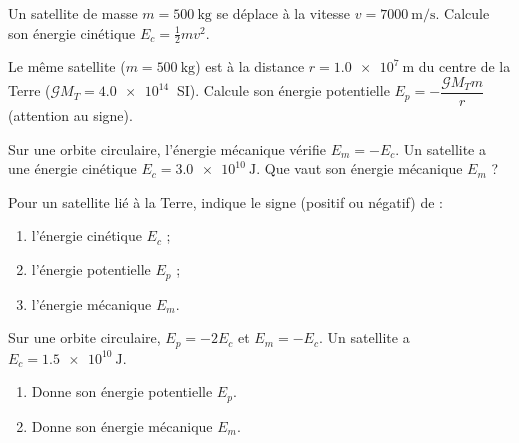 \documentclass[11pt,a4paper]{article}
\begin{document}

\begin{exo}
Un satellite de masse $m=\qty{500}{\kilogram}$ se déplace à la vitesse
$v=\qty{7000}{\metre\per\second}$. Calcule son énergie cinétique $E_c=\tfrac12 m v^2$.
\end{exo}

\begin{exo}
Le même satellite ($m=\qty{500}{\kilogram}$) est à la distance $r=\qty{1.0e7}{\metre}$
du centre de la Terre ($\mathcal{G}M_T=\qty{4.0e14}{}$ SI). Calcule son énergie
potentielle $E_p=-\dfrac{\mathcal{G}M_T m}{r}$ (attention au signe).
\end{exo}

\begin{exo}
Sur une orbite circulaire, l'énergie mécanique vérifie $E_m=-E_c$. Un satellite a une
énergie cinétique $E_c=\qty{3.0e10}{\joule}$. Que vaut son énergie mécanique $E_m$ ?
\end{exo}

\begin{exo}
Pour un satellite lié à la Terre, indique le signe (positif ou négatif) de :
\begin{enumerate}[label=\alph*)]
  \item l'énergie cinétique $E_c$ ;
  \item l'énergie potentielle $E_p$ ;
  \item l'énergie mécanique $E_m$.
\end{enumerate}
\end{exo}

\begin{exo}
Sur une orbite circulaire, $E_p=-2E_c$ et $E_m=-E_c$. Un satellite a
$E_c=\qty{1.5e10}{\joule}$.
\begin{enumerate}[label=\alph*)]
  \item Donne son énergie potentielle $E_p$.
  \item Donne son énergie mécanique $E_m$.
\end{enumerate}
\end{exo}
\end{document}
